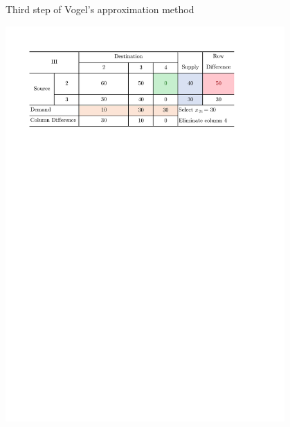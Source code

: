 \documentclass[a4paper]{article}
\begin{document}
\begin{enumerate}
\begin{enumerate}
\begin{solution}
	\begin{table}[H]
		\caption{Third step of Vogel's approximation method}
		\label{tabVO3}
		\centering
		\includegraphics[width = 0.8\textwidth]{VO3}				
	\end{table}


\end{solution}
\end{enumerate}
\end{enumerate}
\end{document}
